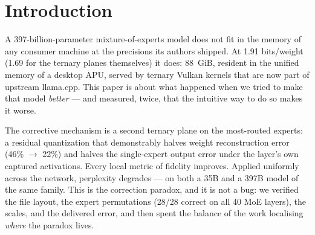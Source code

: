 \documentclass[10pt]{article} %
\begin{document}
\begin{abstract}
suite of 143 coding-and-agentic trials (aggregate results only) the same file
resolves 78.3\% against 55.2\% (exact McNemar $p = 5.42\times 10^{-7}$). Two
further measurements accompany the main result: a GPTQ-calibrated forge that
wins with reasoning off but degenerates into termination-token loops with
reasoning on, where an RTN variant at the same bit-rate reasons correctly;
and the measured \emph{distribution} of the MoE top-$k$ routing margin, which
to our knowledge prior work gives only as a definition or a token-averaged
mean (median $10\times$ narrower than a uniform share; 2.95\% of tokens within
one bf16 ULP of a routing flip).
\end{abstract}

\section{Introduction}
\label{sec:intro}

A 397-billion-parameter mixture-of-experts model does not fit in the memory
of any consumer machine at the precisions its authors shipped. At 1.91
bits/weight (1.69 for the ternary planes themselves) it does: 88~GiB, resident
in the unified memory of a desktop APU, served by ternary Vulkan kernels
that are now part of upstream llama.cpp. This paper is
about what happened when we tried to make that model \emph{better} --- and measured,
twice, that the intuitive way to do so makes it worse.

The corrective mechanism is a second ternary plane on the most-routed
experts: a residual quantization that demonstrably halves weight
reconstruction error (46\% $\to$ 22\%) and halves the single-expert output error
under the layer's own captured activations. Every local metric of fidelity
improves. Applied uniformly across the network, perplexity degrades --- on
both a 35B and a 397B model of the same family. This is the correction
paradox, and it is not a bug: we verified the file layout, the expert
permutations (28/28 correct on all 40 MoE layers), the scales, and the delivered
error, and then spent the balance of the work localising \emph{where} the paradox
lives.
\end{document}
